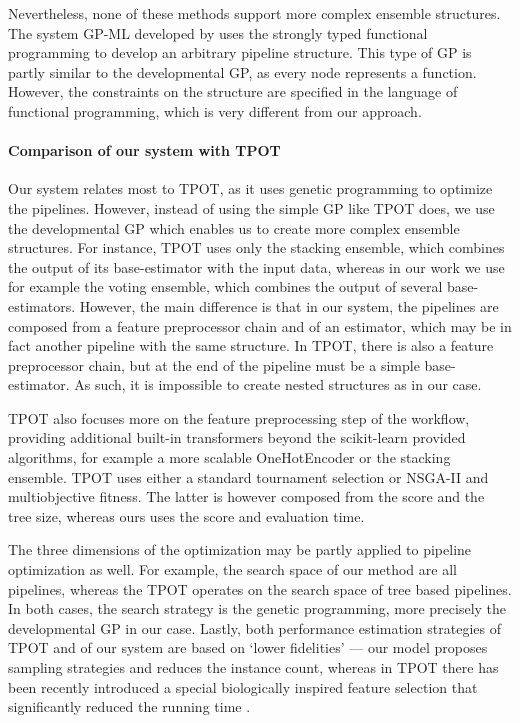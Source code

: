 Nevertheless, none of these methods support more complex ensemble structures. The
system GP-ML developed by \cite{Kren2017AutomaticCO} uses the strongly typed
functional programming to develop an arbitrary pipeline structure. This type of GP
is partly similar to the developmental GP, as every node represents a function.
However, the constraints on the structure are specified in the language of
functional programming, which is very different from our approach.

\paragraph{Comparison of our system with TPOT}
Our system relates most to TPOT, as it uses genetic programming to optimize
the pipelines. However, instead of using the simple GP like TPOT does, we use
the developmental GP which enables us to create more complex ensemble
structures. For instance, TPOT uses only the stacking ensemble, which combines the
output of its base-estimator with the input data, whereas in our work we use for
example the voting ensemble, which combines the output of several base-estimators.
However, the main difference is that in our system, the pipelines are composed
from a feature preprocessor chain and of an estimator, which may be in fact another
pipeline with the same structure. In TPOT, there is also a feature preprocessor
chain, but at the end of the pipeline must be a simple base-estimator. As such, it
is impossible to create nested structures as in our case.

TPOT also focuses more on the feature preprocessing step of the 
workflow, providing additional built-in transformers beyond the scikit-learn 
provided algorithms, for example a more scalable OneHotEncoder or the stacking
ensemble. TPOT uses either a standard tournament selection or 
NSGA-II and multiobjective fitness. The latter is however composed from the 
score and the tree size, whereas ours uses the score and evaluation time.

The three dimensions of the optimization may be partly applied to pipeline
optimization as well. For example, the search space of our method are all pipelines,
whereas the TPOT operates on the search space of tree based pipelines. In both cases,
the search strategy is the genetic programming, more precisely the developmental GP
in our case. Lastly, both performance estimation strategies of TPOT and of our
system are based on `lower fidelities' --- our model proposes sampling strategies and
reduces the instance count, whereas in TPOT there has been recently introduced a
special biologically inspired feature selection that significantly reduced the
running time \citep{Le502484}.

